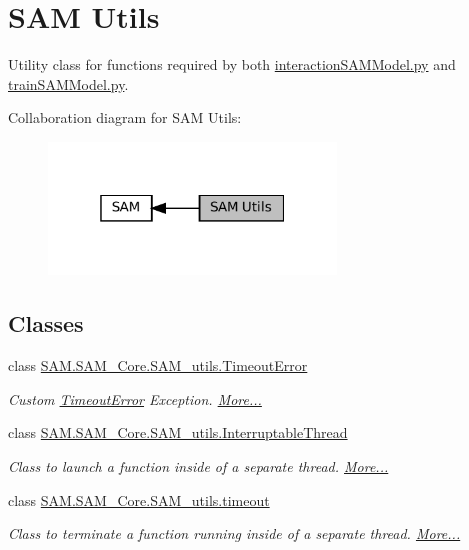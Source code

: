 \hypertarget{group__icubclient__SAM__utils}{}\section{S\+AM Utils}
\label{group__icubclient__SAM__utils}


Utility class for functions required by both \hyperlink{interactionSAMModel_8py}{interaction\+S\+A\+M\+Model.\+py} and \hyperlink{trainSAMModel_8py}{train\+S\+A\+M\+Model.\+py}.  


Collaboration diagram for S\+AM Utils\+:
\nopagebreak
\begin{figure}[H]
\begin{center}
\leavevmode
\includegraphics[width=217pt]{group__icubclient__SAM__utils}
\end{center}
\end{figure}
\subsection*{Classes}
\begin{DoxyCompactItemize}
\item 
class \hyperlink{group__icubclient__SAM__utils_classSAM_1_1SAM__Core_1_1SAM__utils_1_1TimeoutError}{S\+A\+M.\+S\+A\+M\+\_\+\+Core.\+S\+A\+M\+\_\+utils.\+Timeout\+Error}
\begin{DoxyCompactList}\small\item\em Custom \hyperlink{group__icubclient__SAM__utils_classSAM_1_1SAM__Core_1_1SAM__utils_1_1TimeoutError}{Timeout\+Error} Exception.  \hyperlink{group__icubclient__SAM__utils_classSAM_1_1SAM__Core_1_1SAM__utils_1_1TimeoutError}{More...}\end{DoxyCompactList}\item 
class \hyperlink{group__icubclient__SAM__utils_classSAM_1_1SAM__Core_1_1SAM__utils_1_1InterruptableThread}{S\+A\+M.\+S\+A\+M\+\_\+\+Core.\+S\+A\+M\+\_\+utils.\+Interruptable\+Thread}
\begin{DoxyCompactList}\small\item\em Class to launch a function inside of a separate thread.  \hyperlink{group__icubclient__SAM__utils_classSAM_1_1SAM__Core_1_1SAM__utils_1_1InterruptableThread}{More...}\end{DoxyCompactList}\item 
class \hyperlink{group__icubclient__SAM__utils_classSAM_1_1SAM__Core_1_1SAM__utils_1_1timeout}{S\+A\+M.\+S\+A\+M\+\_\+\+Core.\+S\+A\+M\+\_\+utils.\+timeout}
\begin{DoxyCompactList}\small\item\em Class to terminate a function running inside of a separate thread.  \hyperlink{group__icubclient__SAM__utils_classSAM_1_1SAM__Core_1_1SAM__utils_1_1timeout}{More...}\end{DoxyCompactList}\end{DoxyCompactItemize}

